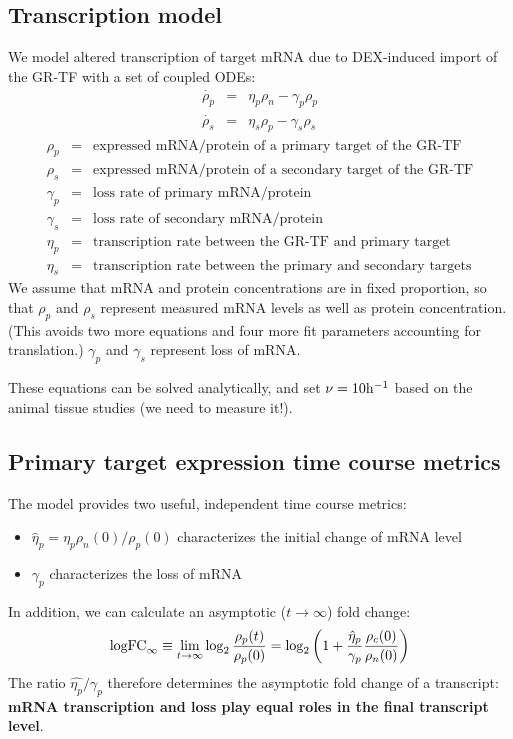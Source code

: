 \documentclass[aspb,landscape]{a0poster}
\begin{document}
\begin{multicols}{3}
  \subsection*{Transcription model}

  We model altered transcription of target mRNA due to DEX-induced import of the GR-TF with a set of coupled ODEs:
  \begin{eqnarray*}
    \dot{\rho_p} &=& \eta_p \rho_n  - \gamma_p \rho_p  \\
    \dot{\rho_s} &=& \eta_s \rho_p  - \gamma_s \rho_s 
  \end{eqnarray*}
  \begin{eqnarray*}
    \rho_p &=& \text{expressed mRNA/protein of a primary target of the GR-TF} \\
    \rho_s &=& \text{expressed mRNA/protein of a secondary target of the GR-TF} \\
    \gamma_p &=& \text{loss rate of primary mRNA/protein} \\
    \gamma_s &=& \text{loss rate of secondary mRNA/protein} \\
    \eta_p &=& \text{transcription rate between the GR-TF and primary target} \\
    \eta_s &=& \text{transcription rate between the primary and secondary targets}
  \end{eqnarray*}
  We assume that mRNA and protein concentrations are in fixed proportion, so that $\rho_p$ and $\rho_s$ represent measured mRNA levels as well as protein concentration.
  (This avoids two more equations and four more fit parameters accounting for translation.)
  $\gamma_p$ and  $\gamma_s$ represent loss of mRNA.

  These equations can be solved analytically, and set $\nu=10 {\rm h}^{-1}$ based on the animal tissue studies (we need to measure it!).
  
  \subsection*{Primary target expression time course metrics}

  The model provides two useful, independent time course  metrics:
  \begin{itemize}
    \item $\hat{\eta}_p  = \eta_p \rho_n(0) / \rho_p(0)$ characterizes the initial change of mRNA level
    \item $\gamma_p$ characterizes the loss of mRNA
  \end{itemize}
  In addition, we can calculate an asymptotic ($t\rightarrow\infty$) fold change:
  \begin{equation*}
    {\rm logFC}_\infty \equiv \lim_{t \to \infty} \log_2\frac{\rho_p(t)}{\rho_p(0)} = \log_2\left(1 + \frac{\hat{\eta}_p}{\gamma_p} \frac{\rho_c(0)}{\rho_n(0)} \right)
  \end{equation*}
  The ratio $\hat{\eta_p}/\gamma_p$ therefore determines the asymptotic fold change of a transcript: \textbf{mRNA transcription and loss play equal roles in the final transcript level}.


\end{multicols}
\end{document}
